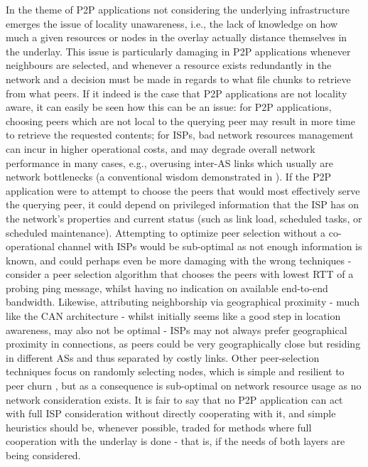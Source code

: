 \documentclass[
  oneside,
  11pt, a4paper,
  footinclude=true,
  headinclude=true,
  cleardoublepage=empty
]{scrbook}
\begin{document}
	In the theme of P2P applications not considering the underlying infrastructure emerges the issue of locality unawareness, i.e., the lack of knowledge on how much a given resources or nodes in the overlay actually distance themselves in the underlay. This issue is particularly damaging in P2P applications whenever neighbours are selected, and whenever a resource exists redundantly in the network and a decision must be made in regards to what file chunks to retrieve from what peers. If it indeed is the case that P2P applications are not locality aware, it can easily be seen how this can be an issue: for P2P applications, choosing peers which are not local to the querying peer may result in more time to retrieve the requested contents; for ISPs, bad network resources management can incur in higher operational costs, and may degrade overall network performance in many cases, e.g., overusing inter-AS links which usually are network bottlenecks (a conventional wisdom demonstrated in \cite{akella}). If the P2P application were to attempt to choose the peers that would most effectively serve the querying peer, it could depend on privileged information that the ISP has on the network's properties and current status (such as link load, scheduled tasks, or scheduled maintenance). Attempting to optimize peer selection without a co-operational channel with ISPs would be sub-optimal as not enough information is known, and could perhaps even be more damaging with the wrong techniques - consider a peer selection algorithm that chooses the peers with lowest RTT of a probing ping message, whilst having no indication on available end-to-end bandwidth. Likewise, attributing neighborship via geographical proximity - much like the CAN architecture - whilst initially seems like a good step in location awareness, may also not be optimal - ISPs may not always prefer geographical proximity in connections, as peers could be very geographically close but residing in different ASs and thus separated by costly links. Other peer-selection techniques focus on randomly selecting nodes, which is simple and resilient to peer churn \cite{qin2009}, but as a consequence is sub-optimal on network resource usage as no network consideration exists. It is fair to say that no P2P application can act with full ISP consideration without directly cooperating with it, and simple heuristics should be, whenever possible, traded for methods where full cooperation with the underlay is done - that is, if the needs of both layers are being considered.
	
\end{document}
